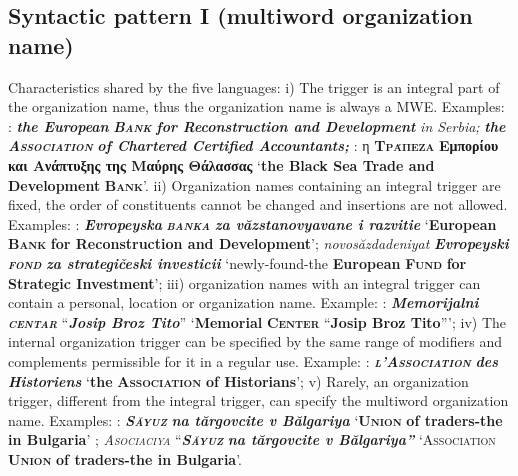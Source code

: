 \documentclass[output=paper]{langsci/langscibook}
\newcommand{\trigger}[1]{\textsc{#1}}
\begin{document}
 
\subsection{Syntactic pattern I (multiword organization name)}

Characteristics shared by the five languages: i) The trigger is an
integral part of the organization name, thus the organization name is
always a MWE. Examples: : \textbf{\textit{the European
}}\textbf{\textit{\trigger{Bank}}} \textbf{\textit{for Reconstruction and
Development }}\textit{in Serbia;} \textbf{\textit{the
}}\textbf{\textit{\trigger{Association}}} \textbf{\textit{of Chartered
Certified Accountants;}} : η
\textbf{\trigger{Τράπεζα}}\textbf{ Εμπορίου και
Ανάπτυξης της Μαύρης Θάλασσας }‘\textbf{the Black Sea Trade and
Development }\textbf{\trigger{Bank}}’. ii) Organization names containing
an integral trigger are fixed, the order of constituents cannot be
changed and insertions are not allowed. Examples: :
\textbf{\textit{Evropeyska }}\textbf{\textit{\trigger{banka}}}
\textbf{\textit{za văzstanovyavane i razvitie}} ‘\textbf{European
}\textbf{\trigger{Bank}} \textbf{for Reconstruction and Development}’;
\textit{novosăzdadeniyat} \textbf{\textit{Evropeyski
}}\textbf{\textit{\trigger{fond}}} \textbf{\textit{za strategičeski
investicii }}‘newly-found-the \textbf{European }\textbf{\trigger{Fund}}
\textbf{for Strategic Investment}'; iii) organization names with an
integral trigger can contain a personal, location or organization name.
Example: : \textbf{\textit{Memorijalni
}}\textbf{\textit{\trigger{centar}}} “\textbf{\textit{Josip Broz Tito}}”
‘\textbf{Memorial }\textbf{\trigger{Center}} “\textbf{Josip Broz Tito}”’;
iv) The internal organization trigger can be specified by the same
range of modifiers and complements permissible for it in a regular use.
Example: : \textbf{\textit{\trigger{l’Association}}}
\textbf{\textit{des Historiens}} ‘\textbf{the
}\textbf{\trigger{Association}} \textbf{of Historians}’; v) Rarely, an
organization trigger, different from the integral trigger, can specify
the multiword organization name. Examples: :
\textbf{\textit{\trigger{Săyuz}}} \textbf{\textit{na tărgovcite v
Bălgariya }}‘\textbf{\trigger{Union}} \textbf{of traders-the in
Bulgaria}’ ; \textit{\trigger{Asociaciya}}
“\textbf{\textit{\trigger{Săyuz}}} \textbf{\textit{na tărgovcite v
Bălgariya” }}‘\trigger{Association} \textbf{\trigger{Union}} \textbf{of
traders-the in Bulgaria}’.
\end{document}

